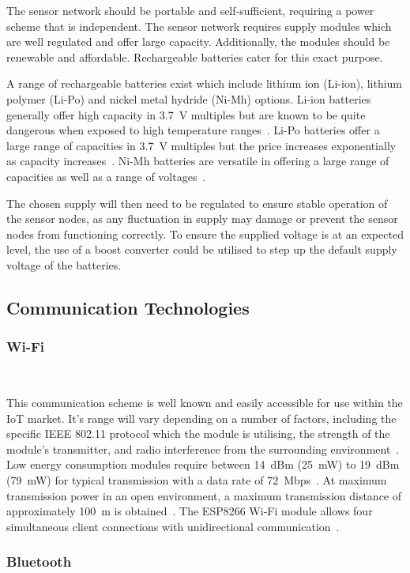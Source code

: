\documentclass[10pt,twocolumn]{witseiepaper}
\begin{document}
			The sensor network should be portable and self-sufficient, requiring a power scheme that is independent. The sensor network requires supply modules which are well regulated and offer large capacity. Additionally, the modules should be renewable and affordable. Rechargeable batteries cater for this exact purpose.

			A range of rechargeable batteries exist which include lithium ion (Li-ion), lithium polymer (Li-Po) and nickel metal hydride (Ni-Mh) options. Li-ion batteries generally offer high capacity in 3.7~V multiples but are known to be quite dangerous when exposed to high temperature ranges~\cite{li-ion}. Li-Po batteries offer a large range of capacities in 3.7~V multiples but the price increases exponentially as capacity increases~\cite{li-po}. Ni-Mh batteries are versatile in offering a large range of capacities as well as a range of voltages~\cite{ni-mh}.

			The chosen supply will then need to be regulated to ensure stable operation of the sensor nodes, as any fluctuation in supply may damage or prevent the sensor nodes from functioning correctly. To ensure the supplied voltage is at an expected level, the use of a boost converter could be utilised to step up the default supply voltage of the batteries.
	
	\subsection{Communication Technologies}
		\subsubsection{Wi-Fi} $   $
		
			This communication scheme is well known and easily accessible for use within the IoT market. It's range will vary depending on a number of factors, including the specific IEEE 802.11 protocol which the module is utilising, the strength of the module's transmitter, and radio interference from the surrounding environment~\cite{802.11}. Low energy consumption modules require between 14~dBm (25~mW) to 19~dBm (79~mW) for typical transmission with a data rate of 72~Mbps~\cite{esp12e}. At maximum transmission power in an open environment, a maximum transmission distance of approximately 100~m is obtained~\cite{esp12e}. The ESP8266 \mbox{Wi-Fi} module allows four simultaneous client connections with unidirectional communication~\cite{esp12e}.

		\subsubsection{Bluetooth} $   $
		
\end{document}
